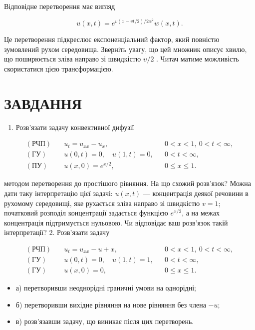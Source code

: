 \documentclass[
  ukrainian,
]{article}
\providecommand{\tightlist}{%
  \setlength{\itemsep}{0pt}\setlength{\parskip}{0pt}}
\begin{document}
Відповідне перетворення має вигляд

\[
u(x, t) = e^{v(x-vt/2)/2\alpha^2}w(x, t).
\]

Це перетворення підкреслює експоненціальний фактор, який повністю
зумовлений рухом середовища. Зверніть увагу, що цей множник описує
хвилю, що поширюється зліва направо зі швидкістю \(\upsilon/2\) . Читач
матиме можливість скористатися цією трансформацією.

\section{ЗАВДАННЯ}\label{ux437ux430ux432ux434ux430ux43dux43dux44f-7}

\begin{enumerate}
\def\labelenumi{\arabic{enumi}.}
\tightlist
\item
  Розв'язати задачу конвективної дифузії
\end{enumerate}

\[
\begin{aligned}
(\text{РЧП})\quad & u_t = u_{xx} - u_x, && 0 < x < 1,\ 0 < t < \infty, \\
(\text{ГУ})\quad & u(0,t) = 0,\quad u(1,t) = 0, && 0 < t < \infty, \\
(\text{ПУ})\quad & u(x,0) = e^{x/2}, && 0 \leqslant x \leqslant 1.
\end{aligned}
\]

методом перетворення до простішого рівняння. На що схожий розв'язок?
Можна дати таку інтерпретацію цієї задачі: \(u(x,t)\) --- концентрація
деякої речовини в рухомому середовищі, яке рухається зліва направо зі
швидкістю \(v = 1\); початковий розподіл концентрації задається функцією
\(e^{x/2}\), а на межах концентрація підтримується нульовою. Чи
відповідає ваш розв'язок такій інтерпретації? 2. Розв'язати задачу

\[
\begin{aligned}
(\text{РЧП})\quad & u_t = u_{xx} - u + x, && 0 < x < 1,\ 0 < t < \infty, \\
(\text{ГУ})\quad & u(0,t) = 0,\quad u(1,t) = 1, && 0 < t < \infty, \\
(\text{ГУ})\quad & u(x,0) = 0, && 0 \leqslant x \leqslant 1.
\end{aligned}
\]

\begin{itemize}
\tightlist
\item
  а) перетворивши неоднорідні граничні умови на однорідні;
\item
  б) перетворивши вихідне рівняння на нове рівняння без члена \(-u\);
\item
  в) розв'язавши задачу, що виникає після цих перетворень.
\end{itemize}
\end{document}
